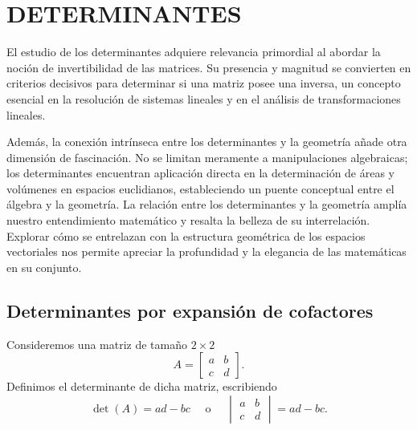 \chapter{DETERMINANTES}

El estudio de los determinantes adquiere relevancia primordial al abordar la noción de invertibilidad de las matrices. Su presencia y magnitud se convierten en criterios decisivos para determinar si una matriz posee una inversa, un concepto esencial en la resolución de sistemas lineales y en el análisis de transformaciones lineales.

Además, la conexión intrínseca entre los determinantes y la geometría añade otra dimensión de fascinación. No se limitan meramente a manipulaciones algebraicas; los determinantes encuentran aplicación directa en la determinación de áreas y volúmenes en espacios euclidianos, estableciendo un puente conceptual entre el álgebra y la geometría. La relación entre los determinantes y la geometría amplía nuestro entendimiento matemático y resalta la belleza de su interrelación. Explorar cómo se entrelazan con la estructura geométrica de los espacios vectoriales nos permite apreciar la profundidad y la elegancia de las matemáticas en su conjunto.

\section{Determinantes por expansión de cofactores}

\begin{definicion}{}{}
    Consideremos una matriz de tamaño $2 \times 2$
    $$A = \begin{bmatrix}
        a & b \\
        c & d
    \end{bmatrix}.$$
    Definimos el determinante de dicha matriz, escribiendo
    \begin{equation}
        \det(A) = ad - bc \quad \text{ o } \quad \begin{vmatrix}
            a & b \\
            c & d
        \end{vmatrix} = ad - bc. \label{defdeterminante}
    \end{equation}
\end{definicion}

